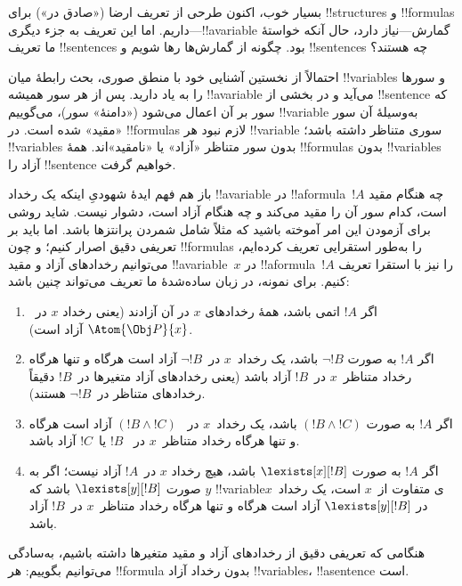 \documentclass[../../../include/open-logic-section]{subfiles}
\begin{document}


بسیار خوب، اکنون طرحی از تعریف ارضا («صادق در») برای !!{structure}s و
!!{formula}s داریم. اما این تعریف به جزء دیگری---!!a{variable}
گمارش---نیاز دارد، حال آنکه خواستهٔ ما تعریف !!{sentence}s بود. چگونه
از گمارش‌ها رها شویم و !!{sentence}s چه هستند؟

احتمالاً از نخستین آشنایی خود با منطق صوری، بحث رابطهٔ میان
!!{variable}s و سورها را به یاد دارید. پس از هر سور همیشه
!!a{variable} می‌آید و در بخشی از !!{sentence} که سور بر آن اعمال
می‌شود («دامنهٔ» سور)، می‌گوییم !!{variable} به‌وسیلهٔ آن سور «مقید»
شده است. در !!{formula}s لازم نبود هر !!{variable} سوری متناظر داشته
باشد؛ !!{variable}s بدون سور متناظر «آزاد» یا «نامقید»اند. همهٔ
!!{formula}s بدون !!{variable}s آزاد را !!{sentence} خواهیم گرفت.

باز هم فهم ایدهٔ شهودیِ اینکه یک رخداد !!a{variable} در
!!a{formula}~$!A$ چه هنگام مقید است، کدام سور آن را مقید می‌کند و چه
هنگام آزاد است، دشوار نیست. شاید روشی برای آزمودن این امر آموخته باشید
که مثلاً شامل شمردن پرانتزها باشد. اما باید بر تعریفی دقیق اصرار کنیم؛
و چون !!{formula}s را به‌طور استقرایی تعریف کرده‌ایم، می‌توانیم رخدادهای
آزاد و مقید !!a{variable}~$x$ در !!a{formula}~$!A$ را نیز با استقرا
تعریف کنیم. برای نمونه، در زبان ساده‌شدهٔ ما تعریف می‌تواند چنین باشد:
\begin{enumerate}
  \item اگر $!A$ اتمی باشد، همهٔ رخدادهای $x$ در آن آزادند (یعنی رخداد
  $x$ در~$\Atom{\Obj P}{x}$ آزاد است).
  \item اگر $!A$ به صورت $\lnot !B$ باشد، یک رخداد~$x$ در~$\lnot !B$
  آزاد است هرگاه و تنها هرگاه رخداد متناظر~$x$ در~$!B$ آزاد باشد (یعنی
  رخدادهای آزاد متغیرها در~$!B$ دقیقاً رخدادهای متناظر در~$\lnot !B$
  هستند).
  \item اگر $!A$ به صورت $(!B \land !C)$ باشد، یک رخداد~$x$ در
  ~$(!B \land !C)$ آزاد است هرگاه و تنها هرگاه رخداد متناظر~$x$ در
  ~$!B$ یا~$!C$ آزاد باشد.
  \item اگر $!A$ به صورت $\lexists[x][!B]$ باشد، هیچ رخداد $x$ در~$!A$
  آزاد نیست؛ اگر به صورت $\lexists[y][!B]$ باشد که $y$ !!{variable}ی
  متفاوت از~$x$ است، یک رخداد~$x$ در $\lexists[y][!B]$ آزاد است هرگاه
  و تنها هرگاه رخداد متناظر~$x$ در~$!B$ آزاد باشد.
\end{enumerate}

هنگامی که تعریفی دقیق از رخدادهای آزاد و مقید متغیرها داشته باشیم،
به‌سادگی می‌توانیم بگوییم: هر !!{formula} بدون رخداد آزاد
!!{variable}s، !!a{sentence} است.
\end{document}
